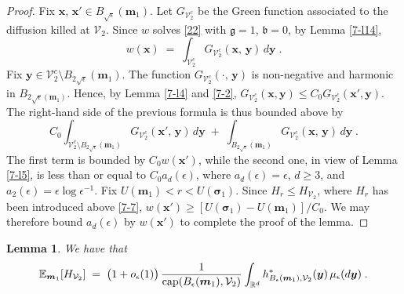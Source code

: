 \documentclass[reqno]{amsart}
\newtheorem{lemma}[theorem]{Lemma}
\newcounter{as}[section]
\newcommand{\mc}[1]{{\mathcal #1}}
\newcommand{\mf}[1]{{\mathfrak #1}}
\newcommand{\bb}[1]{{\mathbb #1}}
\newcommand{\bs}[1]{{\boldsymbol #1}}
\newcommand{\<}{\langle}
\renewcommand{\>}{\rangle}
\renewcommand{\Cap}{{\rm cap}}
\begin{document}
\begin{proof}
Fix $\bs x$, $\bs x' \in B_{\sqrt{\epsilon}}(\bs m_1)$.
Let $G_{\mc V^c_2}$ be the Green function associated to the diffusion
killed at $\mc V_2$. Since $w$ solves \eqref{22} with $\mf g=1$, $\mf
b=0$, by Lemma \ref{7-l14},
\begin{equation*}
w(\bs{x})\;=\;\int_{\mc V_2^c} G_{\mc V^c_2}(\bs{x},\,\bs{y}) \,
d\bs{y}\;.
\end{equation*}
Fix $\bs y\in \mc V_2^c \setminus B_{2\sqrt{\epsilon}}(\bs m_1)$. The
function $G_{\mc V^c_2}(\cdot,\,\bs{y})$ is non-negative and harmonic in
$B_{2\sqrt{\epsilon}(\bs m_1)}$. Hence, by Lemma \ref{7-l4} and
\eqref{7-2}, $G_{\mc V^c_2}(\bs x, \bs{y}) \le C_0 G_{\mc V^c_2}(\bs x',
\bs{y})$. The right-hand side of the previous formula is thus bounded
above by
\begin{equation*}
C_0 \int_{\mc V_2^c \setminus B_{2\sqrt{\epsilon}}(\bs m_1)} G_{\mc V^c_2}(\bs{x}',\,\bs{y}) \,
d\bs{y} \;+\; \int_{B_{2\sqrt{\epsilon}}(\bs m_1)} G_{\mc V^c_2}(\bs{x},\,\bs{y}) \,
d\bs{y} \;.
\end{equation*}
The first term is bounded by $C_0 w(\bs{x}')$, while the second one,
in view of Lemma \ref{7-l5}, is less than or equal to $C_0
a_d(\epsilon)$, where $a_d(\epsilon) = \epsilon$, $d\ge 3$, and
$a_2(\epsilon) = \epsilon \log \epsilon^{-1}$. Fix $U(\bs m_1) < r <
U(\bs \sigma_1)$. Since $H_r \le H_{\mc V_2}$, where $H_r$ has been
introduced above \eqref{7-7}, $w(\bs{x}') \ge [U(\bs \sigma_1) - U(\bs
m_1)]/C_0$. We may therefore bound $a_d(\epsilon)$ by
$w(\bs{x}')$ to complete the proof of the lemma.
\end{proof}

\begin{lemma}
\label{7-l1}
We have that
\begin{equation*}
\bb E_{\bs m_1} [H_{\mc V_2}] \;=\; \big( 1 + o_\epsilon(1)
\big) \, \frac 1{\Cap (B_\epsilon(\bs m_1), \mc V_2)}
\int_{\bb R^d} h^*_{B_\epsilon(\bs m_1), \mc V_2} (\bs y)
\, \mu_{\epsilon}(d\bs y) \;.
\end{equation*}
\end{lemma}
\end{document}
